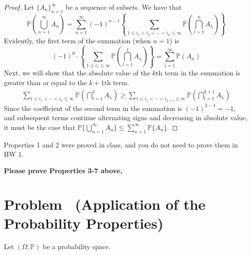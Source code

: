 \documentclass[11pt]{article}
\newcounter{pppp}
\newcommand{\prob}{\arabic{pppp}} %
\newcommand{\increase}{\addtocounter{pppp}{1}} %
\newcommand{\newproblem}[2]{
    \increase
    \section*{Problem \prob~(#1) \hfill {#2}}
}
\newcommand{\p}{\mathbb{P}}
\begin{document}
\begin{enumerate}
\begin{proof}
  Let \(\{A_n\}^{\infty}_{n=1}\) be a sequence of subsets. We have that 
  \[      
    \mathbb{P}\left(\bigcup_{n=1}^\infty A_n\right)=\sum_{n=1}^\infty(-1)^{n-1}\left\{\sum_{1\le i_1<i_2<\cdots<i_n\le \infty} \mathbb{P}\left(\bigcap_{l=1}^n A_{i_l}\right)\right\}
  \]
  Evidently, the first term of the summation (when \(n=1\)) is
  \[
   (-1)^0\cdot \left\{\sum_{1\le i_1 \le \infty} \mathbb{P}\left(\bigcap_{l=1}^1 A_{i_l}\right)\right\} = \sum_{i=1}^\infty \p(A_n)
  \]
  Next, we will show that the absolute value of the \(k\)th term in the summation is greater than or equal to the \(k+1\)th term.
  \begin{align*}
    \sum_{1\leq i_1<\cdots<i_k\leq\infty} \p\left(\bigcap_{l=1}^k A_{i_l}\right) \geq
    \sum_{1\leq i_1<\cdots<i_{k+1}\leq\infty} \p\left(\bigcap_{l=1}^{k+1} A_{i_l}\right)
  \end{align*}
  Since the coefficient of the second term in the summation is \((-1)^{2-1}=-1\), and subsequent terms continue alternating signs and
  decreasing in absolute value, it must be the case that \(\mathbb{P}\{\bigcup_{n=1}^\infty A_n\}\le\sum_{n=1}^\infty\mathbb{P}\{A_n\}\).
\end{proof}
    
\end{enumerate}

Properties 1 and 2 were proved in class, and you do not need to prove them in HW 1. 

\textbf{Please prove Properties 3-7 above.}

\newproblem{Application of the Probability Properties}{ }

Let $(\Omega, \mathbb{P})$ be a probability space.
\end{document}
